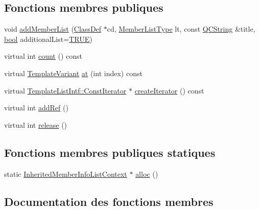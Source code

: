 \subsection*{Fonctions membres publiques}
\begin{DoxyCompactItemize}
\item 
void \hyperlink{class_inherited_member_info_list_context_aaa7738cb8a48f32c6493926fd2a454f2}{add\+Member\+List} (\hyperlink{class_class_def}{Class\+Def} $\ast$cd, \hyperlink{types_8h_abe8ad5992f8938a28f918f51b199aa19}{Member\+List\+Type} lt, const \hyperlink{class_q_c_string}{Q\+C\+String} \&title, \hyperlink{qglobal_8h_a1062901a7428fdd9c7f180f5e01ea056}{bool} additional\+List=\hyperlink{qglobal_8h_a04a6422a52070f0dc478693da640242b}{T\+R\+U\+E})
\item 
virtual int \hyperlink{class_inherited_member_info_list_context_a18ca74744ab2aec906b77ff1611de1c2}{count} () const 
\item 
virtual \hyperlink{class_template_variant}{Template\+Variant} \hyperlink{class_inherited_member_info_list_context_a09d897c724b40688955eb9085c50198f}{at} (int index) const 
\item 
virtual \hyperlink{class_template_list_intf_1_1_const_iterator}{Template\+List\+Intf\+::\+Const\+Iterator} $\ast$ \hyperlink{class_inherited_member_info_list_context_affb774ef66f38099cee8e9ae059c952a}{create\+Iterator} () const 
\item 
virtual int \hyperlink{class_inherited_member_info_list_context_a367a16fa7a17f619910a40778da2af12}{add\+Ref} ()
\item 
virtual int \hyperlink{class_inherited_member_info_list_context_a7a5276e7ac2ff51f66d07715f333cbe7}{release} ()
\end{DoxyCompactItemize}
\subsection*{Fonctions membres publiques statiques}
\begin{DoxyCompactItemize}
\item 
static \hyperlink{class_inherited_member_info_list_context}{Inherited\+Member\+Info\+List\+Context} $\ast$ \hyperlink{class_inherited_member_info_list_context_a4d180c5f0cfe5f540b9250fcd572d62c}{alloc} ()
\end{DoxyCompactItemize}


\subsection{Documentation des fonctions membres}
\hypertarget{class_inherited_member_info_list_context_aaa7738cb8a48f32c6493926fd2a454f2}{}
